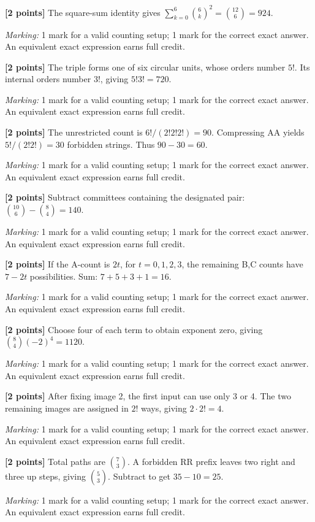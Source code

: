 \documentclass[12pt,letterpaper]{article}
\begin{document}
\begin{description}[font=\normalfont,leftmargin=1.2em,labelsep=0.4em]
\item[(a)] \textbf{[2 points]} The square-sum identity gives $\sum_{k=0}^{6}\binom6k^2=\binom{12}{6}=924$.
\par\textit{Marking:} 1 mark for a valid counting setup; 1 mark for the correct exact answer. An equivalent exact expression earns full credit.
\item[(b)] \textbf{[2 points]} The triple forms one of six circular units, whose orders number $5!$. Its internal orders number $3!$, giving $5!3!=720$.
\par\textit{Marking:} 1 mark for a valid counting setup; 1 mark for the correct exact answer. An equivalent exact expression earns full credit.
\item[(c)] \textbf{[2 points]} The unrestricted count is $6!/(2!2!2!)=90$. Compressing AA yields $5!/(2!2!)=30$ forbidden strings. Thus $90-30=60$.
\par\textit{Marking:} 1 mark for a valid counting setup; 1 mark for the correct exact answer. An equivalent exact expression earns full credit.
\item[(d)] \textbf{[2 points]} Subtract committees containing the designated pair: $\binom{10}{6}-\binom84=140$.
\par\textit{Marking:} 1 mark for a valid counting setup; 1 mark for the correct exact answer. An equivalent exact expression earns full credit.
\item[(e)] \textbf{[2 points]} If the A-count is $2t$, for $t=0,1,2,3$, the remaining B,C counts have $7-2t$ possibilities. Sum: $7+5+3+1=16$.
\par\textit{Marking:} 1 mark for a valid counting setup; 1 mark for the correct exact answer. An equivalent exact expression earns full credit.
\item[(f)] \textbf{[2 points]} Choose four of each term to obtain exponent zero, giving $\binom84(-2)^4=1120$.
\par\textit{Marking:} 1 mark for a valid counting setup; 1 mark for the correct exact answer. An equivalent exact expression earns full credit.
\item[(g)] \textbf{[2 points]} After fixing image 2, the first input can use only 3 or 4. The two remaining images are assigned in $2!$ ways, giving $2\cdot2!=4$.
\par\textit{Marking:} 1 mark for a valid counting setup; 1 mark for the correct exact answer. An equivalent exact expression earns full credit.
\item[(h)] \textbf{[2 points]} Total paths are $\binom73$. A forbidden RR prefix leaves two right and three up steps, giving $\binom53$. Subtract to get $35-10=25$.
\par\textit{Marking:} 1 mark for a valid counting setup; 1 mark for the correct exact answer. An equivalent exact expression earns full credit.
\end{description}
\end{document}
